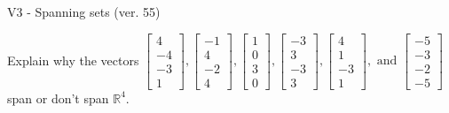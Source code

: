 \begin{exercise}
  \begin{exerciseTitle}V3 - Spanning sets (ver. 55)\end{exerciseTitle}
  \begin{exerciseStatement}
    Explain why the vectors \(\left[\begin{array}{r}
4 \\
-4 \\
-3 \\
1
\end{array}\right] , \left[\begin{array}{r}
-1 \\
4 \\
-2 \\
4
\end{array}\right] , \left[\begin{array}{r}
1 \\
0 \\
3 \\
0
\end{array}\right] , \left[\begin{array}{r}
-3 \\
3 \\
-3 \\
3
\end{array}\right] , \left[\begin{array}{r}
4 \\
1 \\
-3 \\
1
\end{array}\right] , \text{ and } \left[\begin{array}{r}
-5 \\
-3 \\
-2 \\
-5
\end{array}\right]\) span or don't span \(\mathbb{R}^4\). 
	



\end{exerciseStatement}
\end{exercise}
